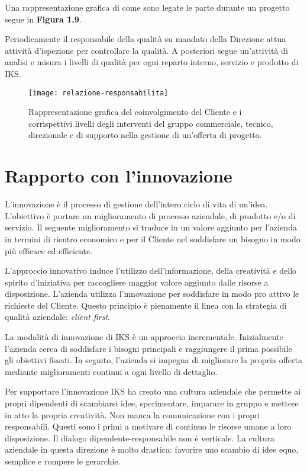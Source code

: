 Una rappresentazione grafica di come sono legate le parte durante un progetto segue in \textbf{Figura 1.9}.

Periodicamente il responsabile della qualità su mandato della Direzione attua attività 
d'ispezione per controllare la qualità. A posteriori segue un'attività di analisi e 
misura i livelli di qualità per ogni reparto interno, servizio e prodotto di IKS.

\begin{figure}[htbp]
	\begin{center}
		\texttt{[image: relazione-responsabilita]}
		\caption{Rappresentazione grafica del coinvolgimento del Cliente e i corrispettivi livelli degli interventi 
			del gruppo commerciale, tecnico, direzionale e di supporto nella gestione di un'offerta di progetto.}
	\end{center}
\end{figure}



\section{Rapporto con l'innovazione}
L'innovazione è il processo di gestione dell'intero ciclo di vita di un'idea. 
L'obiettivo è portare un miglioramento di processo aziendale, di prodotto e/o 
di servizio. Il seguente miglioramento si traduce in un valore aggiunto per l'azienda 
in termini di rientro economico e per il Cliente nel soddisfare un bisogno in modo più
efficace ed efficiente. 

L'approccio innovativo induce l'utilizzo dell'informazione, della creatività e dello spirito 
d'iniziativa per raccogliere maggior valore aggiunto dalle risorse a disposizione. L'azienda 
utilizza l'innovazione per soddisfare in modo pro attivo le richieste del Cliente. Questo principio
è pienamente il linea con la strategia di qualità aziendale: \textit{client first}.

La modalità di innovazione di IKS è un approccio incrementale. Inizialmente l'azienda cerca di 
soddisfare i bisogni principali e raggiungere il prima possibile gli obiettivi fissati. In seguito, 
l'azienda si impegna di migliorare la propria offerta mediante miglioramenti continui a ogni 
livello di dettaglio. 

Per supportare l'innovazione IKS ha creato una cultura aziendale che permette ai propri dipendenti
di scambiarsi idee, sperimentare, imparare in gruppo e mettere in atto la propria creatività.
Non manca la comunicazione con i propri responsabili. Questi sono i primi a motivare di continuo 
le risorse umane a loro disposizione. Il dialogo dipendente-responsabile non è verticale. La cultura 
aziendale in questa direzione è molto drastica: favorire uno scambio di idee equo, semplice e rompere 
le gerarchie. 

